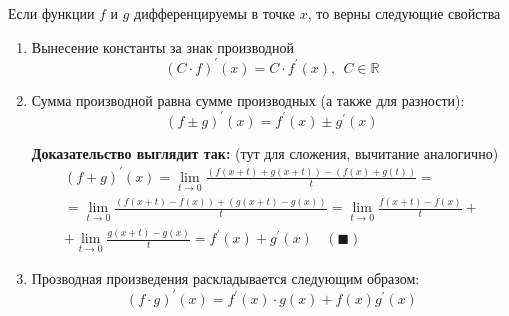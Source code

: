 \documentclass[class=article,a4paper,12pt,crop=false]{standalone}
\begin{document}
Если функции $f$ и $g$ дифференцируемы в точке $x$, то верны следующие свойства

\begin{enumerate}
    \item {
        Вынесение константы за знак производной
        \begin{equation}
            (C\cdot f)^{'}(x) = C\cdot{f^{'}(x)}, \:\: C \in \mathbb{R}
        \end{equation}
    }
    \item {
        Сумма производной равна сумме производных (а также для разности):
        \begin{equation}
            (f \pm g)^{'}(x) = f^{'}(x) \pm g^{'}(x)
        \end{equation}

        \textbf{Доказательство выглядит так:} (тут для сложения, вычитание аналогично)
        \begin{multline}
            (f + g)^{'}(x) = \lim\limits_{t \rightarrow 0}\frac{
                (f(x + t) + g(x + t)) - (f(x) + g(t))
            }{t} = \\ =
            \lim\limits_{t \rightarrow 0}\frac{
                (f(x + t) - f(x)) + (g(x + t) - g(x))
            }{t} = \lim\limits_{t \rightarrow 0}\frac{
                f(x + t) - f(x)
            }{t} + \\ + \lim\limits_{t \rightarrow 0}\frac{g(x + t) - g(x)}{t}
            = f^{'}(x) + g^{'}(x) \:\:\:\: (\blacksquare)
        \end{multline}
    }
    \item {
        Прозводная произведения раскладывается следующим образом:
        \begin{equation}
            (f\cdot{g})^{'}(x) = f^{'}(x)\cdot{g(x)} + f(x)g^{'}(x)
        \end{equation}

}
\end{enumerate}
\end{document}

